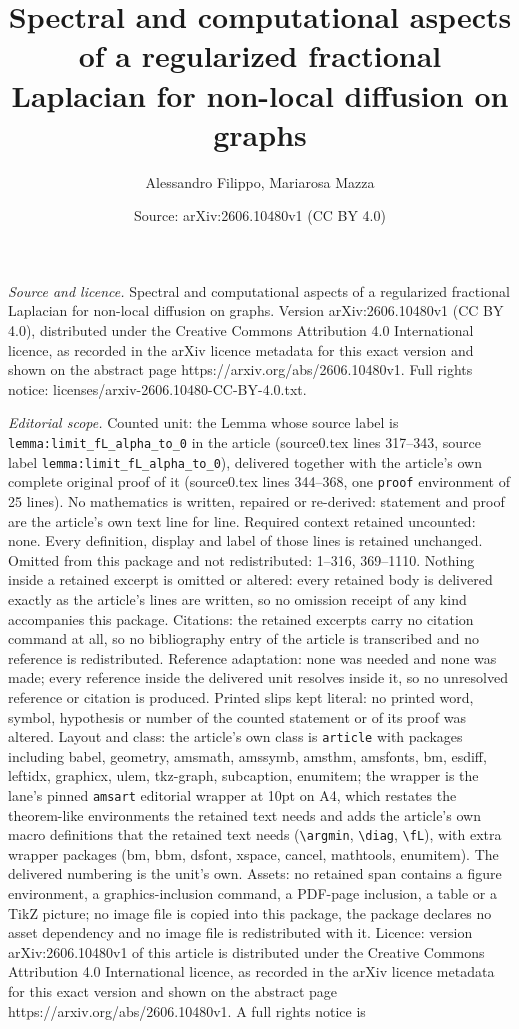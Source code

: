 \documentclass[10pt,a4paper]{amsart}
\title[Spectral and computational aspects of a regularized fraction]{Spectral and computational aspects of a regularized fractional Laplacian for non-local diffusion on graphs}
\author{Alessandro Filippo, Mariarosa Mazza}
\date{Source: arXiv:2606.10480v1 (CC BY 4.0)}
\begin{document}
\maketitle

\noindent\emph{Source and licence.} Spectral and computational aspects of a regularized fractional Laplacian for non-local diffusion on graphs. Version arXiv:2606.10480v1 (CC BY 4.0), distributed under the Creative Commons Attribution 4.0 International licence, as recorded in the arXiv licence metadata for this exact version and shown on the abstract page https://arxiv.org/abs/2606.10480v1. Full rights notice: licenses/arxiv-2606.10480-CC-BY-4.0.txt.\par\smallskip

\noindent\textit{Editorial scope.} Counted unit: the Lemma whose source label is \texttt{lemma:limit\_fL\_alpha\_to\_0} in the article (source0.tex lines 317--343, source label \texttt{lemma:limit\_fL\_alpha\_to\_0}), delivered together with the article's own complete original proof of it (source0.tex lines 344--368, one \texttt{proof} environment of 25 lines). No mathematics is written, repaired or re-derived: statement and proof are the article's own text line for line. Required context retained uncounted: none. Every definition, display and label of those lines is retained unchanged. Omitted from this package and not redistributed: 1--316, 369--1110. Nothing inside a retained excerpt is omitted or altered: every retained body is delivered exactly as the article's lines are written, so no omission receipt of any kind accompanies this package. Citations: the retained excerpts carry no citation command at all, so no bibliography entry of the article is transcribed and no reference is redistributed. Reference adaptation: none was needed and none was made; every reference inside the delivered unit resolves inside it, so no unresolved reference or citation is produced. Printed slips kept literal: no printed word, symbol, hypothesis or number of the counted statement or of its proof was altered. Layout and class: the article's own class is \texttt{article} with packages including babel, geometry, amsmath, amssymb, amsthm, amsfonts, bm, esdiff, leftidx, graphicx, ulem, tkz-graph, subcaption, enumitem; the wrapper is the lane's pinned \texttt{amsart} editorial wrapper at 10pt on A4, which restates the theorem-like environments the retained text needs and adds the article's own macro definitions that the retained text needs (\texttt{\textbackslash argmin}, \texttt{\textbackslash diag}, \texttt{\textbackslash fL}), with extra wrapper packages (bm, bbm, dsfont, xspace, cancel, mathtools, enumitem). The delivered numbering is the unit's own. Assets: no retained span contains a figure environment, a graphics-inclusion command, a PDF-page inclusion, a table or a TikZ picture; no image file is copied into this package, the package declares no asset dependency and no image file is redistributed with it. Licence: version arXiv:2606.10480v1 of this article is distributed under the Creative Commons Attribution 4.0 International licence, as recorded in the arXiv licence metadata for this exact version and shown on the abstract page https://arxiv.org/abs/2606.10480v1. A full rights notice is 
\end{document}
